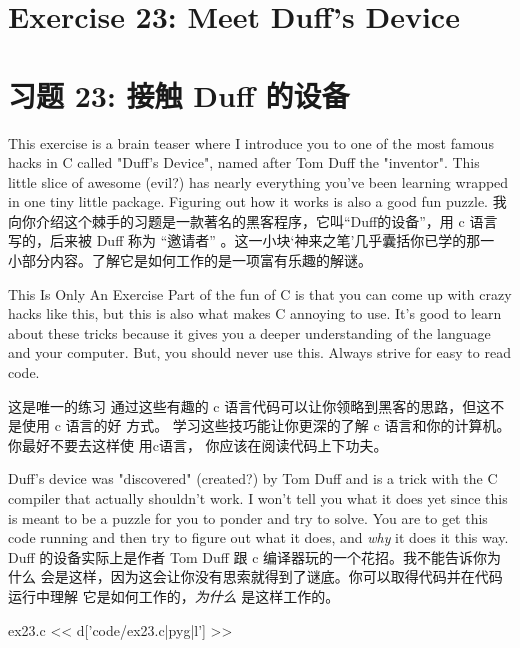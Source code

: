 ﻿\chapter{Exercise 23: Meet Duff's Device}
\chapter{习题 23: 接触 Duff 的设备}


This exercise is a brain teaser where I introduce you to one of the
most famous hacks in C called "Duff's Device", named after Tom Duff
the "inventor".  This little slice of awesome (evil?) has nearly everything
you've been learning wrapped in one tiny little package.  Figuring out
how it works is also a good fun puzzle.
我向你介绍这个棘手的习题是一款著名的黑客程序，它叫“Duff的设备”，用 c 语言
写的，后来被 Duff 称为 “邀请者” 。这一小块‘神来之笔’几乎囊括你已学的那一
小部分内容。了解它是如何工作的是一项富有乐趣的解谜。



\begin{aside}{This Is Only An Exercise}
Part of the fun of C is that you can come up with crazy hacks like this,
but this is also what makes C annoying to use.  It's good to learn about
these tricks because it gives you a deeper understanding of
the language and your computer.  But, you should never use this.  Always
strive for easy to read code.
\end{aside}

\begin{aside}{这是唯一的练习}
通过这些有趣的 c 语言代码可以让你领略到黑客的思路，但这不是使用 c 语言的好
方式。 学习这些技巧能让你更深的了解 c 语言和你的计算机。你最好不要去这样使
用c语言， 你应该在阅读代码上下功夫。
\end{aside}

Duff's device was "discovered" (created?) by Tom Duff and is a trick
with the C compiler that actually shouldn't work.  I won't tell you what
it does yet since this is meant to be a puzzle for you to ponder and
try to solve.  You are to get this code running and then try to figure
out what it does, and \emph{why} it does it this way.
Duff 的设备实际上是作者 Tom Duff 跟 c 编译器玩的一个花招。我不能告诉你为什么
会是这样，因为这会让你没有思索就得到了谜底。你可以取得代码并在代码运行中理解
它是如何工作的，\emph{为什么} 是这样工作的。

\begin{code}{ex23.c}
<< d['code/ex23.c|pyg|l'] >>
\end{code}

